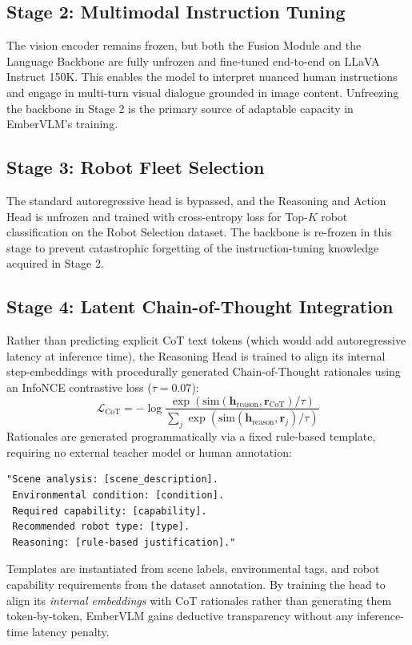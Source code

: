 \subsection{Stage 2: Multimodal Instruction Tuning}
The vision encoder remains frozen, but both the Fusion Module and the Language Backbone are fully unfrozen and fine-tuned end-to-end on LLaVA Instruct 150K. This enables the model to interpret nuanced human instructions and engage in multi-turn visual dialogue grounded in image content. Unfreezing the backbone in Stage 2 is the primary source of adaptable capacity in EmberVLM's training.

\subsection{Stage 3: Robot Fleet Selection}
The standard autoregressive head is bypassed, and the Reasoning and Action Head is unfrozen and trained with cross-entropy loss for Top-$K$ robot classification on the Robot Selection dataset. The backbone is re-frozen in this stage to prevent catastrophic forgetting of the instruction-tuning knowledge acquired in Stage 2.

\subsection{Stage 4: Latent Chain-of-Thought Integration}
Rather than predicting explicit CoT text tokens (which would add autoregressive latency at inference time), the Reasoning Head is trained to align its internal step-embeddings with procedurally generated Chain-of-Thought rationales using an InfoNCE contrastive loss ($\tau{=}0.07$):
\begin{equation}
    \mathcal{L}_{\text{CoT}} = -\log \frac{\exp(\mathrm{sim}(\mathbf{h}_{\text{reason}}, \mathbf{r}_{\text{CoT}})/\tau)}{\sum_{j}\exp(\mathrm{sim}(\mathbf{h}_{\text{reason}}, \mathbf{r}_j)/\tau)}
\end{equation}
Rationales are generated programmatically via a fixed rule-based template, requiring no external teacher model or human annotation:
\begin{verbatim}
"Scene analysis: [scene_description].
 Environmental condition: [condition].
 Required capability: [capability].
 Recommended robot type: [type].
 Reasoning: [rule-based justification]."
\end{verbatim}
Templates are instantiated from scene labels, environmental tags, and robot capability requirements from the dataset annotation. By training the head to align its \emph{internal embeddings} with CoT rationales rather than generating them token-by-token, EmberVLM gains deductive transparency without any inference-time latency penalty.

